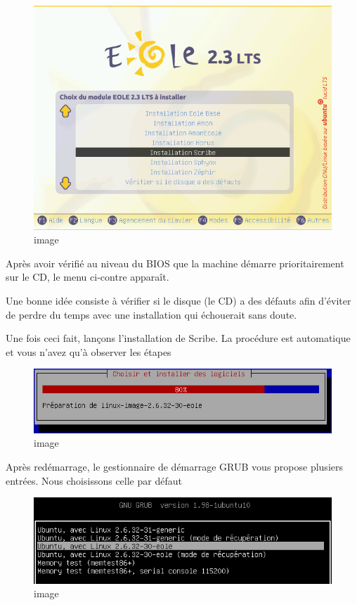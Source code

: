 \documentclass{article}
\makeatletter
\def\maxwidth{\ifdim\Gin@nat@width>\linewidth\linewidth
\else\Gin@nat@width\fi}
\let\Oldincludegraphics\includegraphics
\renewcommand{\includegraphics}[1]{\Oldincludegraphics[width=\maxwidth]{#1}}
\makeatother
\begin{document}
\begin{figure}[htbp]
\centering
\includegraphics{scribe_html_m1451a7db.png}
\caption{image}
\end{figure}

Après avoir vérifié au niveau du BIOS que la machine démarre
prioritairement sur le CD, le menu ci-contre apparaît.

Une bonne idée consiste à vérifier si le disque (le CD) a des défauts
afin d'éviter de perdre du temps avec une installation qui échouerait
sans doute.

Une fois ceci fait, lançons l'installation de Scribe. La procédure est
automatique et vous n'avez qu'à observer les étapes

\begin{figure}[htbp]
\centering
\includegraphics{scribe_html_4b5e166b.png}
\caption{image}
\end{figure}

Après redémarrage, le gestionnaire de démarrage GRUB vous propose
plusiers entrées. Nous choisissons celle par défaut

\begin{figure}[htbp]
\centering
\includegraphics{scribe_html_m6522c87a.png}
\caption{image}
\end{figure}
\end{document}
